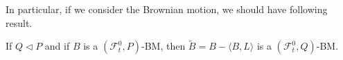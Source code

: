 In particular, if we consider the Brownian motion, we should have following result.
\begin{theorem}\label{thm:Girsanov_we_use}
	If $Q \lhd P$ and if $B$ is a $\left(\mathscr{F}_{t}^{0}, P\right)$-BM, then $\widetilde{B}=B-\langle B, L\rangle$ is a $\left(\mathscr{F}_{t}^{0}, Q\right)$-BM.
\end{theorem}
%
%
